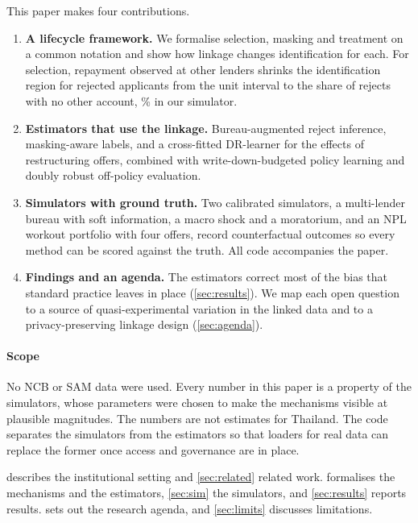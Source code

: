 \documentclass[10pt]{article}
\begin{document}
This paper makes four contributions.
\begin{enumerate}[leftmargin=1.4em]
  \item \textbf{A lifecycle framework.} We formalise selection, masking and treatment on a common notation and show how linkage changes identification for each. For selection, repayment observed at other lenders shrinks the identification region for rejected applicants from the unit interval to the share of rejects with no other account, \EtwoUnobserved\% in our simulator.
  \item \textbf{Estimators that use the linkage.} Bureau-augmented reject inference, masking-aware labels, and a cross-fitted DR-learner for the effects of restructuring offers, combined with write-down-budgeted policy learning and doubly robust off-policy evaluation.
  \item \textbf{Simulators with ground truth.} Two calibrated simulators, a multi-lender bureau with soft information, a macro shock and a moratorium, and an NPL workout portfolio with four offers, record counterfactual outcomes so every method can be scored against the truth. All code accompanies the paper.
  \item \textbf{Findings and an agenda.} The estimators correct most of the bias that standard practice leaves in place (\cref{sec:results}). We map each open question to a source of quasi-experimental variation in the linked data and to a privacy-preserving linkage design (\cref{sec:agenda}).
\end{enumerate}

\paragraph{Scope} No NCB or SAM data were used. Every number in this paper is a property of the simulators, whose parameters were chosen to make the mechanisms visible at plausible magnitudes. The numbers are not estimates for Thailand. The code separates the simulators from the estimators so that loaders for real data can replace the former once access and governance are in place.

 describes the institutional setting and \cref{sec:related} related work.  formalises the mechanisms and the estimators, \cref{sec:sim} the simulators, and \cref{sec:results} reports results.  sets out the research agenda, and \cref{sec:limits} discusses limitations.

\end{document}
